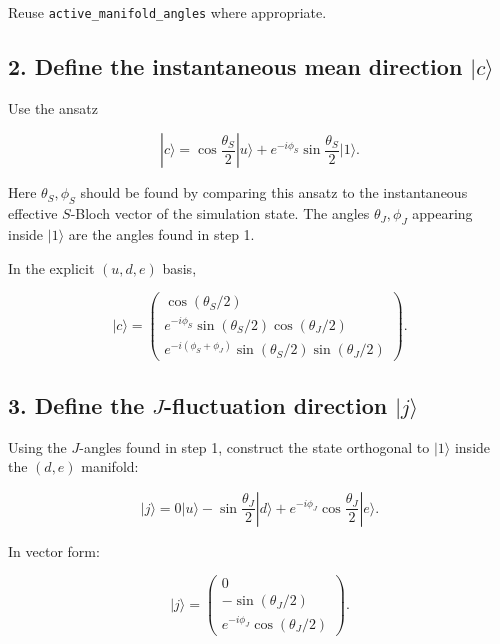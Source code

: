 \documentclass[11pt]{article}
\begin{document}
Reuse \texttt{active\_manifold\_angles} where appropriate.

\subsection*{2. Define the instantaneous mean direction \(|c\rangle\)}

Use the ansatz

\begin{equation}
|c\rangle
=
\cos\frac{\theta_S}{2}|u\rangle
+
e^{-i\phi_S}\sin\frac{\theta_S}{2}|1\rangle.
\end{equation}

Here \(\theta_S,\phi_S\) should be found by comparing this ansatz to the
instantaneous effective \(S\)-Bloch vector of the simulation state. The angles
\(\theta_J,\phi_J\) appearing inside \(|1\rangle\) are the angles found in step
1.

In the explicit \((u,d,e)\) basis,

\begin{equation}
|c\rangle =
\begin{pmatrix}
\cos(\theta_S/2) \\
e^{-i\phi_S}\sin(\theta_S/2)\cos(\theta_J/2) \\
e^{-i(\phi_S+\phi_J)}\sin(\theta_S/2)\sin(\theta_J/2)
\end{pmatrix}.
\end{equation}

\subsection*{3. Define the \(J\)-fluctuation direction \(|j\rangle\)}

Using the \(J\)-angles found in step 1, construct the state orthogonal to
\(|1\rangle\) inside the \((d,e)\) manifold:

\begin{equation}
|j\rangle =
0|u\rangle
-
\sin\frac{\theta_J}{2}|d\rangle
+
e^{-i\phi_J}\cos\frac{\theta_J}{2}|e\rangle.
\end{equation}

In vector form:

\begin{equation}
|j\rangle =
\begin{pmatrix}
0 \\
-\sin(\theta_J/2) \\
e^{-i\phi_J}\cos(\theta_J/2)
\end{pmatrix}.
\end{equation}
\end{document}
